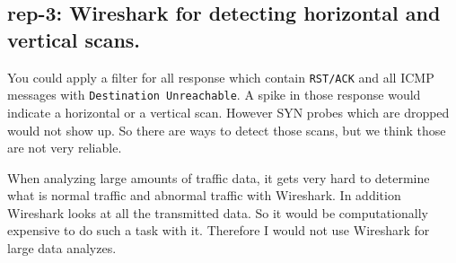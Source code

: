 \subsection*{rep-3: Wireshark for detecting horizontal and vertical scans.}
You could apply a filter for all response which contain \texttt{RST/ACK} and all ICMP messages with \texttt{Destination Unreachable}. A spike in those response would indicate a horizontal or a vertical scan. However SYN probes which are dropped would not show up. So there are ways to detect those scans, but we think those are not very reliable.

When analyzing large amounts of traffic data, it gets very hard to determine what is normal traffic and abnormal traffic with Wireshark. In addition Wireshark looks at all the transmitted data. So it would be computationally expensive to do such a task with it. Therefore I would not use Wireshark for large data analyzes.